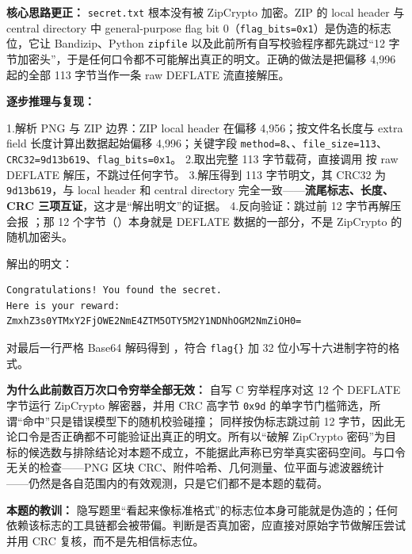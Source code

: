 \textbf{核心思路更正：} \texttt{secret.txt} 根本没有被 ZipCrypto 加密。ZIP 的 local header 与 central directory 中 general-purpose flag bit 0（\texttt{flag\_bits=0x1}）是伪造的标志位，它让 Bandizip、Python \texttt{zipfile} 以及此前所有自写校验程序都先跳过``12 字节加密头''，于是任何口令都不可能解出真正的明文。正确的做法是把偏移 4,996 起的全部 113 字节当作一条 raw DEFLATE 流直接解压。

\textbf{逐步推理与复现：}

1.解析 PNG 与 ZIP 边界：ZIP local header 在偏移 4,956；按文件名长度与 extra field 长度计算出数据起始偏移 4,996；关键字段 \texttt{method=8}、\texttt{}、\texttt{file\_size=113}、\texttt{CRC32=9d13b619}、\texttt{flag\_bits=0x1}。 2.取出完整 113 字节载荷，直接调用 \texttt{} 按 raw DEFLATE 解压，不跳过任何字节。 3.解压得到 113 字节明文，其 CRC32 为 \texttt{9d13b619}，与 local header 和 central directory 完全一致------\textbf{流尾标志、长度、CRC 三项互证}，这才是``解出明文''的证据。 4.反向验证：跳过前 12 字节再解压会报 \texttt{}；那 12 个字节（\texttt{}）本身就是 DEFLATE 数据的一部分，不是 ZipCrypto 的随机加密头。

解出的明文：

\begin{verbatim}
Congratulations! You found the secret.
Here is your reward:
ZmxhZ3s0YTMxY2FjOWE2NmE4ZTM5OTY5M2Y1NDNhOGM2NmZiOH0=
\end{verbatim}

对最后一行严格 Base64 解码得到 \texttt{}，符合 \texttt{flag\{\}} 加 32 位小写十六进制字符的格式。

\textbf{为什么此前数百万次口令穷举全部无效：} 自写 C 穷举程序对这 12 个 DEFLATE 字节运行 ZipCrypto 解密器，并用 CRC 高字节 \texttt{0x9d} 的单字节门槛筛选，所谓``命中''只是错误模型下的随机校验碰撞；\texttt{} 同样按伪标志跳过前 12 字节，因此无论口令是否正确都不可能验证出真正的明文。所有以``破解 ZipCrypto 密码''为目标的候选数与排除结论对本题不成立，不能据此声称已穷举真实密码空间。与口令无关的检查------PNG 区块 CRC、附件哈希、几何测量、位平面与滤波器统计------仍然是各自范围内的有效观测，只是它们都不是本题的载荷。

\textbf{本题的教训：} 隐写题里``看起来像标准格式''的标志位本身可能就是伪造的；任何依赖该标志的工具链都会被带偏。判断是否真加密，应直接对原始字节做解压尝试并用 CRC 复核，而不是先相信标志位。

